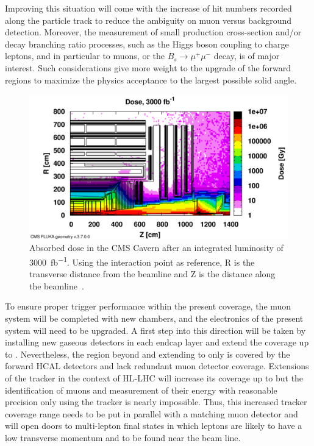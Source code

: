 	Improving this situation will come with the increase of hit numbers recorded along the particle track to reduce the ambiguity on muon versus background detection. Moreover, the measurement of small production cross-section and/or decay branching ratio processes, such as the Higgs boson coupling to charge leptons, and in particular to muons, or the $B_s \rightarrow \mu^+\mu^-$ decay, is of major interest. Such considerations give more weight to the upgrade of the forward regions to maximize the physics acceptance to the largest possible solid angle.
	
\endgroup
\begingroup\setlength{\intextsep}{5pt}\setlength{\columnsep}{15pt}

	\begin{figure}
		\centering
		\vspace{25pt}
		\includegraphics[width=\linewidth]{fig/chapt3/HL-LHC-Dose.png}
		\caption{\label{fig:Dose} Absorbed dose in the CMS Cavern after an integrated luminosity of \SI{3000}{fb^{-1}}. Using the interaction point as reference, R is the transverse distance from the beamline and Z is the distance along the beamline~\cite{PHASEIITP}.}
	\end{figure}
	
	To ensure proper trigger performance within the present coverage, the muon system will be completed with new chambers, and the electronics of the present system will need to be upgraded. A first step into this direction will be taken by installing new gaseous detectors in each endcap layer and extend the coverage up to . Nevertheless, the region beyond  and extending to  only is covered by the forward HCAL detectors and lack redundant muon detector coverage. Extensions of the tracker in the context of HL-LHC will increase its coverage up to  but the identification of muons and measurement of their energy with reasonable precision only using the tracker is nearly impossible. Thus, this increased tracker coverage range needs to be put in parallel with a matching muon detector and will open doors to multi-lepton final states in which leptons are likely to have a low transverse momentum and to be found near the beam line.
	
